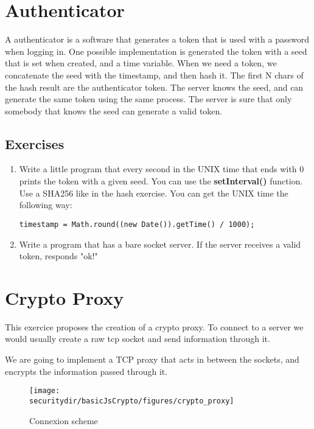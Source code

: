 
\section{Authenticator}
A authenticator is a software that generates a token that is used with a password when logging in. One possible implementation is generated the token with a seed that is set when created, and a time variable. When we need a token, we concatenate the seed with the timestamp, and then hash it. The first N chars of the hash result are the authenticator token. The server knows the seed, and can generate the same token using the same process. The server is sure that only somebody that knows the seed can generate a valid token.

\subsection{Exercises}
\begin{enumerate}
	\item Write a little program that every second in the UNIX time that ends with 0 prints the token with a given seed. You can use the \textbf{setInterval()} function. Use a SHA256 like in the hash exercise. You can get the UNIX time the following way:
	\begin{lstlisting}[style=JavaScript]
	timestamp = Math.round((new Date()).getTime() / 1000);
	\end{lstlisting}
	\item Write a program that has a bare socket server. If the server receives a valid token, responds "ok!" 
\end{enumerate}


\section{Crypto Proxy}
This exercice proposes the creation of a crypto proxy. To connect to a server we would usually create a raw tcp socket and send information through it. 

We are going to implement a TCP proxy that acts in between the sockets, and encrypts the information passed through it.

\begin{figure}[htb]
	\begin{centering}
		\texttt{[image: \\securitydir/basicJsCrypto/figures/crypto\_proxy]}
		\par\end{centering}
	\caption{\label{fig:crypto_proxy} Connexion scheme}
\end{figure}



